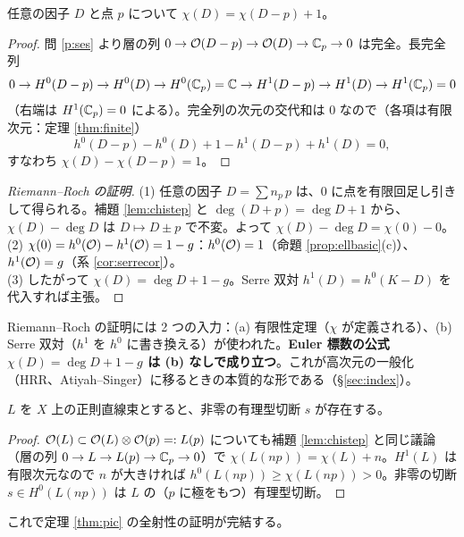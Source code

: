 \begin{lem}\label{lem:chistep}
任意の因子 $D$ と点 $p$ について $\chi(D)=\chi(D-p)+1$。
\end{lem}
\begin{proof}
問 \ref{p:ses} より層の列 $0\to\mathcal O(D-p)\to\mathcal O(D)\to\mathbb C_p\to0$ は完全。長完全列
\[
0\to H^0(D-p)\to H^0(D)\to H^0(\mathbb C_p)=\mathbb C\to H^1(D-p)\to H^1(D)\to H^1(\mathbb C_p)=0
\]
（右端は $H^1(\mathbb C_p)=0$ による）。完全列の次元の交代和は $0$ なので（各項は有限次元：定理 \ref{thm:finite}）
\[
h^0(D-p)-h^0(D)+1-h^1(D-p)+h^1(D)=0,
\]
すなわち $\chi(D)-\chi(D-p)=1$。
\end{proof}
\begin{proof}[Riemann--Roch の証明]
(1) 任意の因子 $D=\sum n_p\,p$ は、$0$ に点を有限回足し引きして得られる。補題 \ref{lem:chistep} と $\deg(D+p)=\deg D+1$ から、$\chi(D)-\deg D$ は $D\mapsto D\pm p$ で不変。よって $\chi(D)-\deg D=\chi(0)-0$。\\
(2) $\chi(0)=h^0(\mathcal O)-h^1(\mathcal O)=1-g$：$h^0(\mathcal O)=1$（命題 \ref{prop:ellbasic}(c)）、$h^1(\mathcal O)=g$（系 \ref{cor:serrecor}）。\\
(3) したがって $\chi(D)=\deg D+1-g$。Serre 双対 $h^1(D)=h^0(K-D)$ を代入すれば主張。
\end{proof}
Riemann--Roch の証明には 2 つの入力：(a) 有限性定理（$\chi$ が定義される）、(b) Serre 双対（$h^1$ を $h^0$ に書き換える）が使われた。\textbf{Euler 標数の公式 $\chi(D)=\deg D+1-g$ は (b) なしで成り立つ}。これが高次元の一般化（HRR、Atiyah--Singer）に移るときの本質的な形である（\S\ref{sec:index}）。

\begin{lem}[直線束は有理型切断をもつ]\label{lem:meromsec}
$L$ を $X$ 上の正則直線束とすると、非零の有理型切断 $s$ が存在する。
\end{lem}
\begin{proof}
$\mathcal O(L)\subset\mathcal O(L)\otimes\mathcal O(p)=:L(p)$ についても補題 \ref{lem:chistep} と同じ議論（層の列 $0\to L\to L(p)\to\mathbb C_p\to0$）で $\chi(L(np))=\chi(L)+n$。$H^1(L)$ は有限次元なので $n$ が大きければ $h^0(L(np))\ge\chi(L(np))>0$。非零の切断 $s\in H^0(L(np))$ は $L$ の（$p$ に極をもつ）有理型切断。
\end{proof}
これで定理 \ref{thm:pic} の全射性の証明が完結する。

